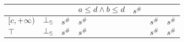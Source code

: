 \documentclass{beamer}
\begin{document}
\begin{frame}
\begin{table}[]
{\begin{tabular}{|l|l|ll|ll|ll|l|}
                                        &                         &                            &                                & $a \le d \land b \le d$ & $s^\#$                   &                            &                                           &                                                 \\ \hline
        $[c, +\infty)$                  & $\bot_\mathbb{S}$                  & \multicolumn{2}{l|}{$s^\#$}                                 & \multicolumn{2}{l|}{$s^\#$}                        & \multicolumn{2}{l|}{$s^\#$}                                            & $s^\#$                                          \\ \hline
        $\top$                          & $\bot_\mathbb{S}$                  & \multicolumn{2}{l|}{$s^\#$}                                 & \multicolumn{2}{l|}{$s^\#$}                        & \multicolumn{2}{l|}{$s^\#$}                                            & $s^\#$                                          \\ \hline
        \end{tabular}}
        \end{table}
    \end{frame}
    
\end{document}
